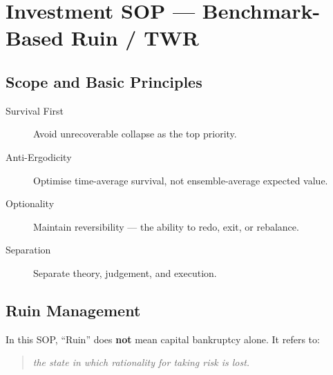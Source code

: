 
\chapter{Investment SOP --- Benchmark-Based Ruin / TWR}
\label{ch:investment-sop}


\section{Scope and Basic Principles}
\label{sec:invest-scope}

\begin{description}
\item[Survival First] Avoid unrecoverable collapse as the top
priority.
\item[Anti-Ergodicity] Optimise time-average survival, not
ensemble-average expected value.
\item[Optionality] Maintain reversibility --- the ability to redo,
exit, or rebalance.
\item[Separation] Separate theory, judgement, and execution.
\end{description}

\section{Ruin Management}
\label{sec:invest-ruin}

In this SOP, ``Ruin'' does \textbf{not} mean capital bankruptcy alone.
It refers to:

\begin{quote}
\centering
\textit{the state in which rationality for taking risk is lost.}
\end{quote}

